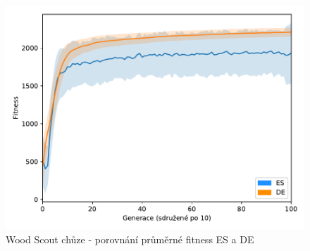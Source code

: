 	\begin{figure}[t]\centering
		\includegraphics[width=\columnwidth]{../img/WoodMap/DEvsES/WCuttorWalkMem}
		\caption{ Wood Scout chůze - porovnání průměrné fitness ES a DE}
		\label{obr04:WalkESvsDE}
	\end{figure}
	\clearpage
	
